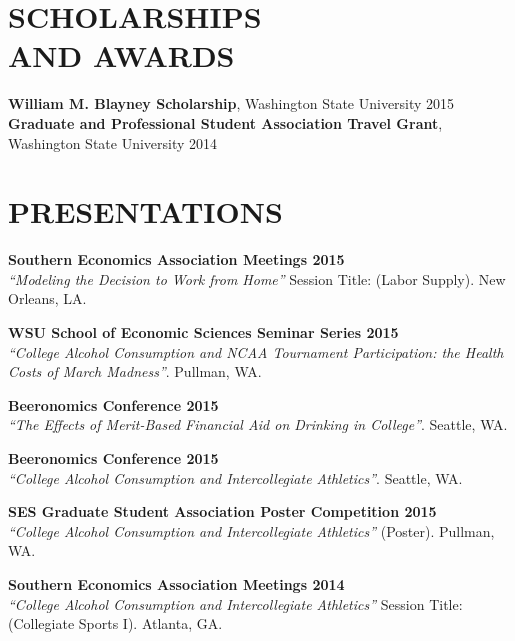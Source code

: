 \documentclass[margin]{res}  %
\begin{document}
\begin{resume}
\section{\textnormal{SCHOLARSHIPS\\AND AWARDS}}
\textbf{William M. Blayney Scholarship}, Washington State University \hfill 2015 \\[12pt]
\textbf{Graduate and Professional Student Association Travel Grant},\\ Washington State University \hfill 2014 \\


\section{\textnormal{PRESENTATIONS}}

\textbf{Southern Economics Association Meetings 2015}\\
\emph{``Modeling the Decision to Work from Home''}
Session Title: (Labor Supply). New Orleans, LA. %

\textbf{WSU School of Economic Sciences Seminar Series 2015}\\
\emph{``College Alcohol Consumption and NCAA Tournament Participation: the Health Costs of March Madness''}. Pullman, WA. %

\textbf{Beeronomics Conference 2015}\\
\emph{``The Effects of Merit-Based Financial Aid on Drinking in College''}. Seattle, WA. %

\textbf{Beeronomics Conference 2015}\\
\emph{``College Alcohol Consumption and Intercollegiate Athletics''}. Seattle, WA. %

\textbf{SES Graduate Student Association Poster Competition 2015}\\
\emph{``College Alcohol Consumption and Intercollegiate Athletics''} (Poster). Pullman, WA. %

\textbf{Southern Economics Association Meetings 2014}\\
\emph{``College Alcohol Consumption and Intercollegiate Athletics''}
Session Title: (Collegiate Sports I). Atlanta, GA. %


\end{resume}
\end{document}
